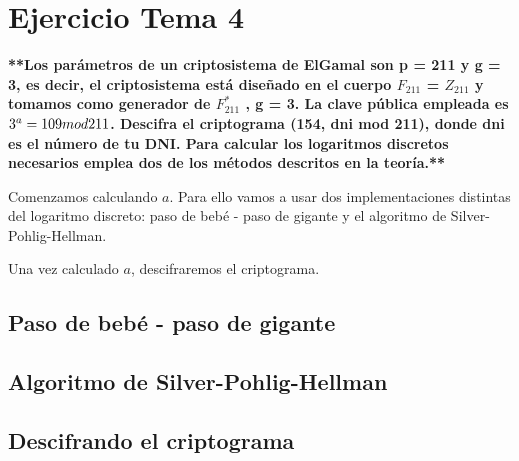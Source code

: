 \documentclass[a4paper]{article}
\title {\fbox{\Huge{\textbf{Ejercicio Tema 4}}}}
\author {\fbox{Ana Buendía Ruiz-Azuaga}}
\begin{document}
\maketitle


\section{Ejercicio Tema 4}

\textbf{**Los parámetros de un criptosistema de ElGamal son p = 211 y g = 3, es decir, el criptosistema está diseñado en el cuerpo $F_{211}$ = $Z_{211}$ y tomamos como generador de $F^*_{211}$ , g = 3. La clave pública empleada es $3^a = 109 \\mod 211$. Descifra el criptograma (154, dni mod 211), donde dni es el número de tu DNI. Para calcular los logaritmos discretos necesarios emplea dos de los métodos descritos en la teoría.**}

Comenzamos calculando $a$. Para ello vamos a usar dos implementaciones distintas del logaritmo discreto: paso de bebé - paso de gigante y el algoritmo de Silver-Pohlig-Hellman.

Una vez calculado $a$, descifraremos el criptograma.

\subsection{Paso de bebé - paso de gigante}



\subsection{Algoritmo de Silver-Pohlig-Hellman}



\subsection{Descifrando el criptograma}
\end{document}
